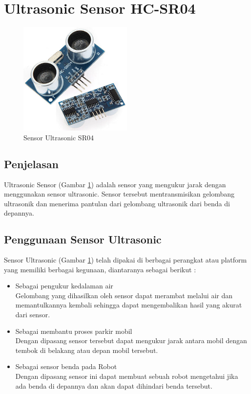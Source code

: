 \section{Ultrasonic Sensor HC-SR04}
\begin{figure}[ht]
\centerline{\includegraphics[width=0.5\textwidth]{figures/sensor.jpg}}
\caption{Sensor Ultrasonic SR04}
\label{sensor}
\end{figure}
\subsection{Penjelasan}
Ultrasonic Sensor (Gambar \ref{sensor}) adalah sensor yang mengukur jarak dengan menggunakan sensor ultrasonic. Sensor tersebut mentransmisikan gelombang ultrasonik dan menerima pantulan dari gelombang ultrasonik dari benda di depannya. 
\subsection{Penggunaan Sensor Ultrasonic}
Sensor Ultrasonic (Gambar \ref{sensor}) telah dipakai di berbagai perangkat atau platform yang memiliki berbagai kegunaan, diantaranya sebagai berikut : 
\begin{itemize}
	\item Sebagai pengukur kedalaman air \\ Gelombang yang dihasilkan oleh sensor dapat merambat melalui air dan memantulkannya kembali sehingga dapat mengembalikan hasil yang akurat dari sensor.
	\item Sebagai membantu proses parkir mobil \\  Dengan dipasang sensor tersebut dapat mengukur jarak antara mobil dengan tembok di belakang atau depan mobil tersebut.
	\item Sebagai sensor benda pada Robot \\ \cite{ruan2014ultrasonic} Dengan dipasang sensor ini dapat membuat sebuah robot mengetahui jika ada benda di depannya dan akan dapat dihindari benda tersebut.
\end{itemize}
